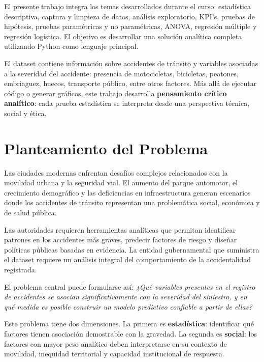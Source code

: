 \documentclass[11pt,a4paper]{article}
\begin{document}
El presente trabajo integra los temas desarrollados durante el curso: estadística descriptiva,
captura y limpieza de datos, análisis exploratorio, KPI's, pruebas de hipótesis, pruebas
paramétricas y no paramétricas, ANOVA, regresión múltiple y regresión logística. El objetivo
es desarrollar una solución analítica completa utilizando Python como lenguaje principal.

El dataset contiene información sobre accidentes de tránsito y variables asociadas a la
severidad del accidente: presencia de motocicletas, bicicletas, peatones, embriaguez,
huecos, transporte público, entre otros factores. Más allá de ejecutar código o generar
gráficos, este trabajo desarrolla \textbf{pensamiento crítico analítico}: cada prueba
estadística se interpreta desde una perspectiva técnica, social y ética.

\section{Planteamiento del Problema}

Las ciudades modernas enfrentan desafíos complejos relacionados con la movilidad urbana y
la seguridad vial. El aumento del parque automotor, el crecimiento demográfico y las
deficiencias en infraestructura generan escenarios donde los accidentes de tránsito
representan una problemática social, económica y de salud pública.

Las autoridades requieren herramientas analíticas que permitan identificar patrones en los
accidentes más graves, predecir factores de riesgo y diseñar políticas públicas basadas en
evidencia. La entidad gubernamental que suministra el dataset requiere un análisis integral
del comportamiento de la accidentalidad registrada.

El problema central puede formularse así: \textit{¿Qué variables presentes en el registro de
accidentes se asocian significativamente con la severidad del siniestro, y en qué medida es
posible construir un modelo predictivo confiable a partir de ellas?}

Este problema tiene dos dimensiones. La primera es \textbf{estadística}: identificar qué
factores tienen asociación demostrable con la gravedad. La segunda es \textbf{social}: los
factores con mayor peso analítico deben interpretarse en su contexto de movilidad, inequidad
territorial y capacidad institucional de respuesta.
\end{document}
